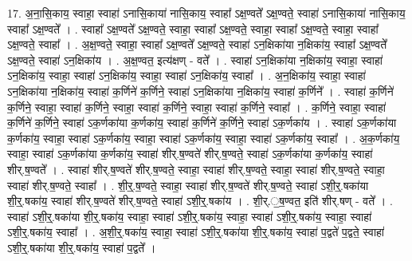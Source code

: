 \documentclass[17pt]{extarticle}
\begin{document}
17. अ॒ना॒सि॒काय॒ स्वाहा॒ स्वाहा॑ ऽनासि॒काया॑ नासि॒काय॒ स्वाहा᳚ ऽक्ष॒ण्वते᳚ ऽक्ष॒ण्वते॒ स्वाहा॑ ऽनासि॒काया॑ नासि॒काय॒ स्वाहा᳚ ऽक्ष॒ण्वते᳚ । . स्वाहा᳚ ऽक्ष॒ण्वते᳚ ऽक्ष॒ण्वते॒ स्वाहा॒ स्वाहा᳚ ऽक्ष॒ण्वते॒ स्वाहा॒ स्वाहा᳚ ऽक्ष॒ण्वते॒ स्वाहा॒ स्वाहा᳚ ऽक्ष॒ण्वते॒ स्वाहा᳚ । . अ॒क्ष॒ण्वते॒ स्वाहा॒ स्वाहा᳚ ऽक्ष॒ण्वते᳚ ऽक्ष॒ण्वते॒ स्वाहा॑ ऽन॒क्षिका॑या न॒क्षिका॑य॒ स्वाहा᳚ ऽक्ष॒ण्वते᳚ ऽक्ष॒ण्वते॒ स्वाहा॑ ऽन॒क्षिका॑य । . अ॒क्ष॒ण्वत॒ इत्य॑क्षण् - वते᳚ । . स्वाहा॑ ऽन॒क्षिका॑या न॒क्षिका॑य॒ स्वाहा॒ स्वाहा॑ ऽन॒क्षिका॑य॒ स्वाहा॒ स्वाहा॑ ऽन॒क्षिका॑य॒ स्वाहा॒ स्वाहा॑ ऽन॒क्षिका॑य॒ स्वाहा᳚ । . अ॒न॒क्षिका॑य॒ स्वाहा॒ स्वाहा॑ ऽन॒क्षिका॑या न॒क्षिका॑य॒ स्वाहा॑ क॒र्णिने॑ क॒र्णिने॒ स्वाहा॑ ऽन॒क्षिका॑या न॒क्षिका॑य॒ स्वाहा॑ क॒र्णिने᳚ । . स्वाहा॑ क॒र्णिने॑ क॒र्णिने॒ स्वाहा॒ स्वाहा॑ क॒र्णिने॒ स्वाहा॒ स्वाहा॑ क॒र्णिने॒ स्वाहा॒ स्वाहा॑ क॒र्णिने॒ स्वाहा᳚ । . क॒र्णिने॒ स्वाहा॒ स्वाहा॑ क॒र्णिने॑ क॒र्णिने॒ स्वाहा॑ ऽक॒र्णका॑या क॒र्णका॑य॒ स्वाहा॑ क॒र्णिने॑ क॒र्णिने॒ स्वाहा॑ ऽक॒र्णका॑य । . स्वाहा॑ ऽक॒र्णका॑या क॒र्णका॑य॒ स्वाहा॒ स्वाहा॑ ऽक॒र्णका॑य॒ स्वाहा॒ स्वाहा॑ ऽक॒र्णका॑य॒ स्वाहा॒ स्वाहा॑ ऽक॒र्णका॑य॒ स्वाहा᳚ । . अ॒क॒र्णका॑य॒ स्वाहा॒ स्वाहा॑ ऽक॒र्णका॑या क॒र्णका॑य॒ स्वाहा॑ शीर्.ष॒ण्वते॑ शीर्.ष॒ण्वते॒ स्वाहा॑ ऽक॒र्णका॑या क॒र्णका॑य॒ स्वाहा॑ शीर्.ष॒ण्वते᳚ । . स्वाहा॑ शीर्.ष॒ण्वते॑ शीर्.ष॒ण्वते॒ स्वाहा॒ स्वाहा॑ शीर्.ष॒ण्वते॒ स्वाहा॒ स्वाहा॑ शीर्.ष॒ण्वते॒ स्वाहा॒ स्वाहा॑ शीर्.ष॒ण्वते॒ स्वाहा᳚ । . शी॒र्॒.ष॒ण्वते॒ स्वाहा॒ स्वाहा॑ शीर्.ष॒ण्वते॑ शीर्.ष॒ण्वते॒ स्वाहा॑ ऽशी॒र्॒.षका॑या शी॒र्॒.षका॑य॒ स्वाहा॑ शीर्.ष॒ण्वते॑ शीर्.ष॒ण्वते॒ स्वाहा॑ ऽशी॒र्॒.षका॑य । . शी॒र्.॒ष॒ण्वत॒ इति॑ शीर्.षण् - वते᳚ । . स्वाहा॑ ऽशी॒र्॒.षका॑या शी॒र्॒.षका॑य॒ स्वाहा॒ स्वाहा॑ ऽशी॒र्॒.षका॑य॒ स्वाहा॒ स्वाहा॑ ऽशी॒र्॒.षका॑य॒ स्वाहा॒ स्वाहा॑ ऽशी॒र्॒.षका॑य॒ स्वाहा᳚ । . अ॒शी॒र्॒.षका॑य॒ स्वाहा॒ स्वाहा॑ ऽशी॒र्॒.षका॑या शी॒र्॒.षका॑य॒ स्वाहा॑ प॒द्वते॑ प॒द्वते॒ स्वाहा॑ ऽशी॒र्॒.षका॑या शी॒र्॒.षका॑य॒ स्वाहा॑ प॒द्वते᳚ । \newline
\end{document}
